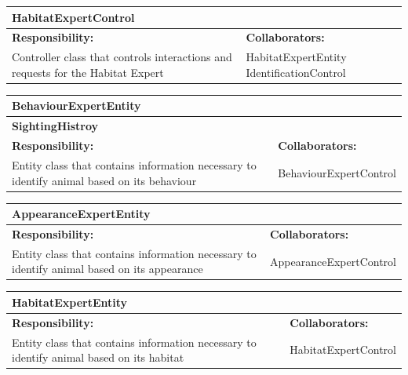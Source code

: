 \documentclass[]{article}
\begin{document}
\begin{table}[H]
	\centering
	\begin{tabular}{|p{5cm}|p{5cm}|}
		\hline
		\multicolumn{2}{|l|}{\textbf{HabitatExpertControl}} \\
		\hline
		\textbf{Responsibility:} & \textbf{Collaborators:} \\
		\hline
		 Controller class that controls interactions and requests for the Habitat Expert & HabitatExpertEntity \break IdentificationControl\\
\hline
	\end{tabular}
\end{table}
\begin{table}[H]
	\centering
	\begin{tabular}{|p{5cm}|p{5cm}|}
		\hline

		\multicolumn{2}{|l|}{\textbf{BehaviourExpertEntity}} \\
		\hline
		\multicolumn{2}{|l|}{\textbf{SightingHistroy}} \\\hline
		\textbf{Responsibility:} & \textbf{Collaborators:} \\
		\hline
		 Entity class that contains information necessary to identify animal based on its behaviour & BehaviourExpertControl\\
\hline
	\end{tabular}
\end{table}
\begin{table}[H]
	\centering
	\begin{tabular}{|p{5cm}|p{5cm}|}
		\hline
		\multicolumn{2}{|l|}{\textbf{AppearanceExpertEntity}} \\
		\hline
		\textbf{Responsibility:} & \textbf{Collaborators:} \\
		\hline
		 Entity class that contains information necessary to identify animal based on its appearance & AppearanceExpertControl\\
		\hline

	\end{tabular}
\end{table}
\begin{table}[H]
	\centering
	\begin{tabular}{|p{5cm}|p{5cm}|}
		\hline
		\multicolumn{2}{|l|}{\textbf{HabitatExpertEntity}} \\
		\hline
		\textbf{Responsibility:} & \textbf{Collaborators:} \\
		\hline
		 Entity class that contains information necessary to identify animal based on its habitat & HabitatExpertControl\\
\hline
	\end{tabular}
\end{table}
\end{document}
